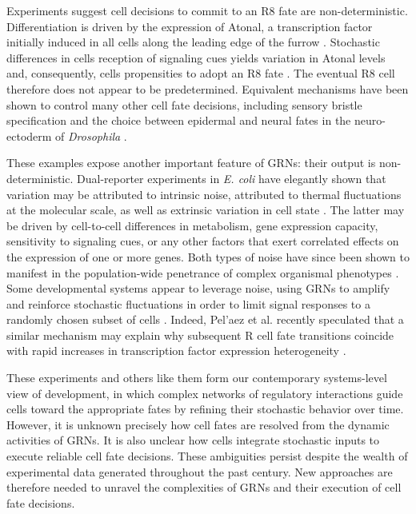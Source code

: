 Experiments suggest cell decisions to commit to an R8 fate are non-deterministic. Differentiation is driven by the expression of Atonal, a transcription factor initially induced in all cells along the leading edge of the furrow \cite{Jarman1994,Baker1997,Hsiung2002}. Stochastic differences in cells reception of signaling cues yields variation in Atonal levels and, consequently, cells propensities to adopt an R8 fate \cite{Baker1990,Gavish2016}. The eventual R8 cell therefore does not appear to be predetermined. Equivalent mechanisms have been shown to control many other cell fate decisions, including sensory bristle specification and the choice between epidermal and neural fates in the neuro-ectoderm of \textit{Drosophila} \cite{Ghysen1993,Simpson1997}.

These examples expose another important feature of GRNs: their output is non-deterministic. Dual-reporter experiments in \emph{E. coli} have elegantly shown that variation may be attributed to intrinsic noise, attributed to thermal fluctuations at the molecular scale, as well as extrinsic variation in cell state \cite{Elowitz2002}. The latter may be driven by cell-to-cell differences in metabolism, gene expression capacity, sensitivity to signaling cues, or any other factors that exert correlated effects on the expression of one or more genes. Both types of noise have since been shown to manifest in the population-wide penetrance of complex organismal phenotypes \cite{Raj2010,Paulsen2011,Burga2011,Colman-Lerner2005}. Some developmental systems appear to leverage noise, using GRNs to amplify and reinforce stochastic fluctuations in order to limit signal responses to a randomly chosen subset of cells \cite{Baker1990,Ghysen1993,Simpson1997}. Indeed, Pel'{a}ez et al. recently speculated that a similar mechanism may explain why subsequent R cell fate transitions coincide with rapid increases in transcription factor expression heterogeneity \cite{Pelaez2015a}.

These experiments and others like them form our contemporary systems-level view of development, in which complex networks of regulatory interactions guide cells toward the appropriate fates by refining their stochastic behavior over time. However, it is unknown precisely how cell fates are resolved from the dynamic activities of GRNs. It is also unclear how cells integrate stochastic inputs to execute reliable cell fate decisions. These ambiguities persist despite the wealth of experimental data generated throughout the past century. New approaches are therefore needed to unravel the complexities of GRNs and their execution of cell fate decisions.

